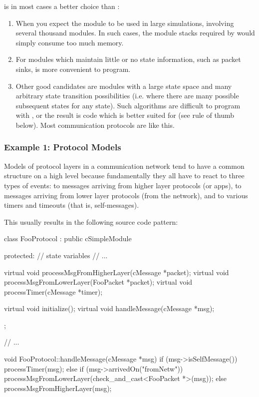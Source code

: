  is in most cases a better choice than :

\begin{enumerate}
  \item{When you expect the module to be used in large simulations,
      involving several thousand modules. In such cases, the module stacks
      required by  would simply consume too much memory.}
  \item{For modules which maintain little or no state information,
      such as packet sinks,  is more convenient to program.}
  \item{Other good candidates are modules with a large state space and
      many arbitrary state transition possibilities (i.e. where there
      are many possible subsequent states for any state). Such algorithms
      are difficult to program with , or the result is code
      which is better suited for  (see rule of thumb
      below). Most communication protocols are like this.}
\end{enumerate}


\subsubsection{Example 1: Protocol Models}

Models of protocol layers in a communication network tend to have
a common structure on a high level because fundamentally they all have to react
to three types of events: to messages arriving from higher layer protocols
(or apps), to messages arriving from lower layer protocols (from the network),
and to various timers and timeouts (that is, self-messages).

This usually results in the following source code pattern:

\begin{cpp}
class FooProtocol : public cSimpleModule
{
  protected:
    // state variables
    // ...

    virtual void processMsgFromHigherLayer(cMessage *packet);
    virtual void processMsgFromLowerLayer(FooPacket *packet);
    virtual void processTimer(cMessage *timer);

    virtual void initialize();
    virtual void handleMessage(cMessage *msg);
};

// ...

void FooProtocol::handleMessage(cMessage *msg)
{
    if (msg->isSelfMessage())
        processTimer(msg);
    else if (msg->arrivedOn("fromNetw"))
        processMsgFromLowerLayer(check_and_cast<FooPacket *>(msg));
    else
        processMsgFromHigherLayer(msg);
}
\end{cpp}

